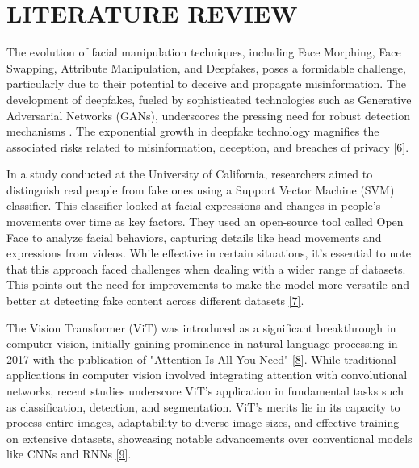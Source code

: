 \section{LITERATURE REVIEW}

The evolution of facial manipulation techniques, including Face Morphing, Face Swapping, Attribute Manipulation, and Deepfakes, poses a formidable challenge, particularly due to their potential to deceive and propagate misinformation. The development of deepfakes, fueled by sophisticated technologies such as Generative Adversarial Networks (GANs), underscores the pressing need for robust detection mechanisms . The exponential growth in deepfake technology magnifies the associated risks related to misinformation, deception, and breaches of privacy \hyperref[ref6]{[6]}.

\noindent In a study conducted at the University of California, researchers aimed to distinguish real people from fake ones using a Support Vector Machine (SVM) classifier. This classifier looked at facial expressions and changes in people's movements over time as key factors. They used an open-source tool called Open Face to analyze facial behaviors, capturing details like head movements and expressions from videos. While effective in certain situations, it's essential to note that this approach faced challenges when dealing with a wider range of datasets. This points out the need for improvements to make the model more versatile and better at detecting fake content across different datasets \hyperref[ref7]{[7]}.

\noindent The Vision Transformer (ViT) was introduced as a significant breakthrough in computer vision, initially gaining prominence in natural language processing in 2017 with the publication of "Attention Is All You Need" \hyperref[ref8]{[8]}. While traditional applications in computer vision involved integrating attention with convolutional networks, recent studies underscore ViT's application in fundamental tasks such as classification, detection, and segmentation. ViT's merits lie in its capacity to process entire images, adaptability to diverse image sizes, and effective training on extensive datasets, showcasing notable advancements over conventional models like CNNs and RNNs \hyperref[ref9]{[9]}.

